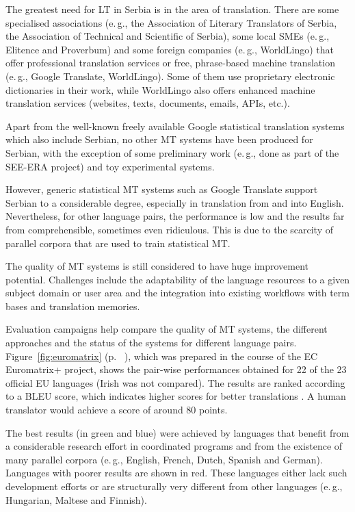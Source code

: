 \begin{multicols}{2}
The greatest need for LT in Serbia is in the area of translation. There are some specialised associations (e.\,g., the Association of Literary Translators of Serbia, the Association of Technical and Scientific of Serbia), some local SMEs (e.\,g., Elitence and Proverbum) and some foreign companies (e.\,g., WorldLingo) that offer professional translation services or free, phrase-based machine translation (e.\,g., Google Translate, WorldLingo). Some of them use proprietary electronic dictionaries in their work, while WorldLingo also offers enhanced machine translation services (websites, texts, documents, emails, APIs, etc.). 

Apart from the well-known freely available Google statistical translation systems which also include Serbian, no other MT systems have been produced for Serbian, with the exception of some preliminary work (e.\,g., done as part of the SEE-ERA project) and toy experimental systems. 

However, generic statistical MT systems such as Google Translate support Serbian to a considerable degree, especially in translation from and into English. Nevertheless, for other language pairs, the performance is low and the results far from comprehensible, sometimes even ridiculous. This is due to the scarcity of parallel corpora that are used to train statistical MT.

The quality of MT systems is still considered to have huge improvement potential. Challenges include the adaptability of the language resources to a given subject domain or user area and the integration into existing workflows with term bases and translation memories. 

Evaluation campaigns help compare the quality of MT systems, the different approaches and the status of the systems for different language pairs. Figure~\ref{fig:euromatrix} (p. ~\pageref{fig:euromatrix}), which was prepared in the course of the EC Euromatrix+ project, shows the pair-wise performances obtained for 22 of the 23 official EU languages (Irish was not compared). The results are ranked according to a BLEU score, which indicates higher scores for better translations \cite{bleu1}. A human translator would achieve a score of around 80 points.

The best results (in green and blue) were achieved by languages that benefit from a considerable research effort in coordinated programs and from the existence of many parallel corpora (e.\,g., English, French, Dutch, Spanish and German). Languages with poorer results are shown in red. These languages either lack such development efforts or are structurally very different from other languages (e.\,g., Hungarian, Maltese and Finnish).



\end{multicols}
